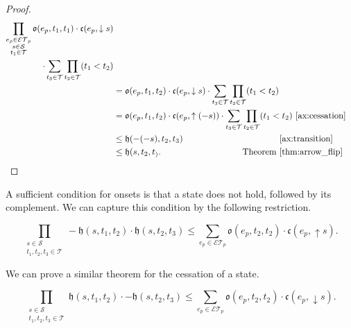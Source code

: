 \begin{proof}
	\begin{align*}
		\prod_{\substack{e_p \in \mathcal{ET}_p                                                               \\ s \in \mathcal{S} \\ t_1 \in \mathcal{T}}}\mathfrak{o}(e_p, t_1, t_1) \cdot \mathfrak{c}(e_p, \downarrow s)\\    \cdot
		\sum_{t_3 \in \mathcal{T}} \prod_{t_2 \in \mathcal{T}} (t_1 < t_2)                                    \\
		 & = \mathfrak{o}(e_p, t_1, t_2) \cdot \mathfrak{c}(e_p, \downarrow s)               \cdot
		\sum_{t_3 \in \mathcal{T}} \prod_{t_2 \in \mathcal{T}} (t_1 < t_2)                                    \\
		 & = \mathfrak{o}(e_p, t_1, t_2) \cdot \mathfrak{c}(e_p, \uparrow (-s))  \cdot
		\sum_{t_3 \in \mathcal{T}} \prod_{t_2 \in \mathcal{T}} (t_1 < t_2)         \text{~\ref{ax:cessation}} \\
		 & \leq \mathfrak{h}(-(-s), t_2, t_3) \hspace{0.31 \textwidth}   \text{~\ref{ax:transition}}          \\
		 & \leq  \mathfrak{h}(s, t_2, t_).  \hspace{0.27 \textwidth }  \text{Theorem~\ref{thm:arrow_flip}}
	\end{align*}
\end{proof}

A sufficient condition for onsets is that a state does not hold, followed by its complement. We can capture this condition by the following restriction.

\begin{equation}\label{ax:transition_2}
	\prod_{\substack{s \in \mathcal{S} \\ t_1, t_2, t_3 \in \mathcal{T}}}- \mathfrak{h}(s, t_1, t_2) \cdot \mathfrak{h}(s, t_2, t_3) \leq
	\sum_{e_p \in \mathcal{ET}_p} \mathfrak{o}(e_p, t_2, t_2) \cdot \mathfrak{c}(e_p, \uparrow s).
\end{equation}

We can prove a similar theorem for the cessation of a state.

\begin{theorem}\label{thm:cessation_3}
	\begin{equation}
		\prod_{\substack{s \in \mathcal{S} \\ t_1, t_2, t_3 \in \mathcal{T}}}    \mathfrak{h}(s, t_1, t_2) \cdot - \mathfrak{h}(s, t_2, t_3) \leq
		\sum_{e_p \in \mathcal{ET}_p} \mathfrak{o}(e_p, t_2, t_2) \cdot \mathfrak{c}(e_p, \downarrow s).
	\end{equation}

\end{theorem}

